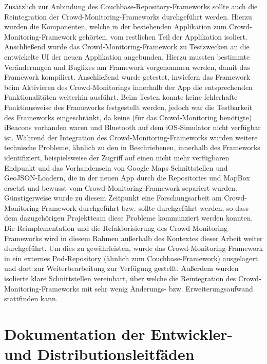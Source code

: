 Zusätzlich zur Anbindung des Couchbase-Repository-Frameworks sollte auch die Reintegration der Crowd-Monitoring-Frameworks durchgeführt werden. Hierzu wurden die Komponenten, welche in der bestehenden Applikation zum Crowd-Monitoring-Framework gehörten, vom restlichen Teil der Applikation isoliert. Anschließend wurde das Crowd-Monitoring-Framework zu Testzwecken an die entwickelte UI der neuen Applikation angebunden. Hierzu mussten bestimmte Veränderungen und Bugfixes am Framework vorgenommen werden, damit das Framework kompiliert. Anschließend wurde getestet, inwiefern das Framework beim Aktivieren des Crowd-Monitorings innerhalb der App die entsprechenden Funktionalitäten weiterhin ausführt. Beim Testen konnte keine fehlerhafte Funktionsweise des Frameworks festgestellt werden, jedoch war die Testbarkeit des Frameworks eingeschränkt, da keine (für das Crowd-Monitoring benötigte) iBeacons vorhanden waren und Bluetooth auf dem iOS-Simulator nicht verfügbar ist. Während der Integration des Crowd-Monitoring-Frameworks wurden weitere technische Probleme, ähnlich zu den in  Beschriebenen, innerhalb des Frameworks identifiziert, beispielsweise der Zugriff auf einen nicht mehr verfügbaren Endpunkt und das Vorhandensein von Google Maps Schnittstellen und GeoJSON-Loadern, die in der neuen App durch die Repositories und MapBox ersetzt und bewusst vom Crowd-Monitoring-Framework separiert wurden. Günstigerweise wurde zu diesem Zeitpunkt eine Forschungsarbeit am Crowd-Monitoring-Framework durchgeführt bzw. sollte durchgeführt werden, so dass dem dazugehörigen Projektteam diese Probleme kommunziert werden konnten. Die Reimplementation und die Refaktorisierung des Crowd-Monitoring-Frameworks wird in diesem Rahmen außerhalb des Kontextes dieser Arbeit weiter durchgeführt. Um dies zu gewährleisten, wurde das Crowd-Monitoring-Framework in ein externes Pod-Repository (ähnlich zum Couchbase-Framework) ausgelagert und dort zur Weiterbearbeitung zur Verfügung gestellt. Außerdem wurden isolierte klare Schnittstellen vereinbart, über welche die Reintegration des Crowd-Monitoring-Frameworks mit sehr wenig Änderungs- bzw. Erweiterungsaufwand stattfinden kann.

\section{Dokumentation der Entwickler- und Distributionsleitfäden}

